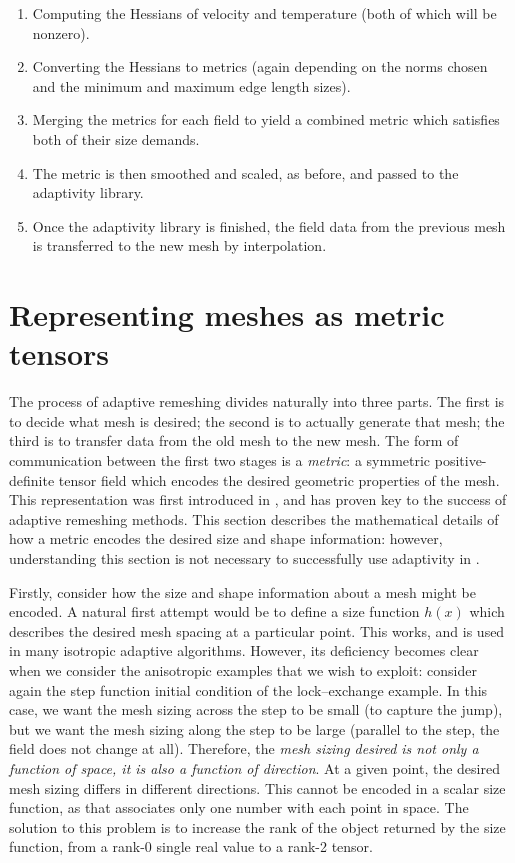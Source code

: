 \begin{enumerate}
  \begin{enumerate}
  \item Computing the Hessians of velocity and temperature (both of which will be nonzero).
  \item Converting the Hessians to metrics (again depending on the norms chosen and the minimum and maximum edge length sizes).
  \item Merging the metrics for each field to yield a combined metric which satisfies both of their size demands.
  \item The metric is then smoothed and scaled, as before, and passed to the adaptivity library.
  \item Once the adaptivity library is finished, the field data from the previous mesh is transferred to the new mesh by interpolation.
  \end{enumerate}
\end{enumerate}

\section{Representing meshes as metric tensors} \label{sec:meshes_and_metrics}
The process of adaptive remeshing divides naturally into three parts. The first is to
decide what mesh is desired; the second is to actually generate that mesh; the third is to
transfer data from the old mesh to the new mesh. The form
of communication between the first two stages is a \emph{metric}: a symmetric positive-definite tensor field
which encodes the desired geometric properties of the mesh. This representation was first introduced
in \citet{vallet1990}, and has proven key to the success of adaptive remeshing methods.
This section describes the mathematical details of how a metric encodes the desired size
and shape information: however, understanding this section is not necessary to successfully
use adaptivity in \fluidity.

Firstly, consider how the size and shape information about a mesh might be encoded. A natural
first attempt would be to define a size function $h(x)$ which describes the desired mesh
spacing at a particular point. This works, and is used in many isotropic adaptive algorithms.
However, its deficiency becomes clear when we consider the anisotropic examples that we
wish to exploit: consider again the step function initial condition of the lock--exchange
example. In this case, we want the mesh sizing across the step to be small (to capture the
jump), but we want the mesh sizing along the step to be large (parallel to the step, the
field does not change at all). Therefore, the \emph{mesh sizing desired is not only a function
of space, it is also a function of direction}. At a given point, the desired mesh sizing differs
in different directions. This cannot be encoded in a scalar size function, as that associates
only one number with each point in space. The solution to this problem is to increase the rank
of the object returned by the size function, from a rank-0 single real value to a rank-2 tensor.


